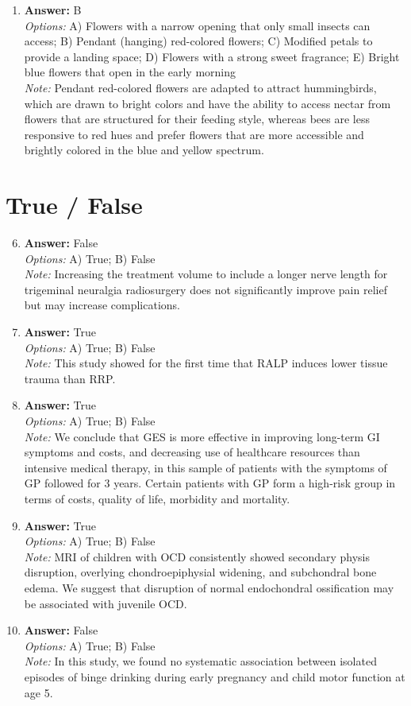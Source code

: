 \documentclass[12pt]{article}
\begin{document}
\begin{enumerate}[label=\arabic*.]
\item \textbf{Answer:} B
\\ \textit{Options:} A) Flowers with a narrow opening that only small insects can access; B) Pendant (hanging) red-colored flowers; C) Modified petals to provide a landing space; D) Flowers with a strong sweet fragrance; E) Bright blue flowers that open in the early morning
\\ \textit{Note:} Pendant red-colored flowers are adapted to attract hummingbirds, which are drawn to bright colors and have the ability to access nectar from flowers that are structured for their feeding style, whereas bees are less responsive to red hues and prefer flowers that are more accessible and brightly colored in the blue and yellow spectrum.
\end{enumerate}

\section*{True / False}
\begin{enumerate}[label=\arabic*.]
\setcounter{enumi}{5}
\item \textbf{Answer:} False
\\ \textit{Options:} A) True; B) False
\\ \textit{Note:} Increasing the treatment volume to include a longer nerve length for trigeminal neuralgia radiosurgery does not significantly improve pain relief but may increase complications.
\item \textbf{Answer:} True
\\ \textit{Options:} A) True; B) False
\\ \textit{Note:} This study showed for the first time that RALP induces lower tissue trauma than RRP.
\item \textbf{Answer:} True
\\ \textit{Options:} A) True; B) False
\\ \textit{Note:} We conclude that GES is more effective in improving long-term GI symptoms and costs, and decreasing use of healthcare resources than intensive medical therapy, in this sample of patients with the symptoms of GP followed for 3 years. Certain patients with GP form a high-risk group in terms of costs, quality of life, morbidity and mortality.
\item \textbf{Answer:} True
\\ \textit{Options:} A) True; B) False
\\ \textit{Note:} MRI of children with OCD consistently showed secondary physis disruption, overlying chondroepiphysial widening, and subchondral bone edema. We suggest that disruption of normal endochondral ossification may be associated with juvenile OCD.
\item \textbf{Answer:} False
\\ \textit{Options:} A) True; B) False
\\ \textit{Note:} In this study, we found no systematic association between isolated episodes of binge drinking during early pregnancy and child motor function at age 5.
\end{enumerate}
\end{document}
